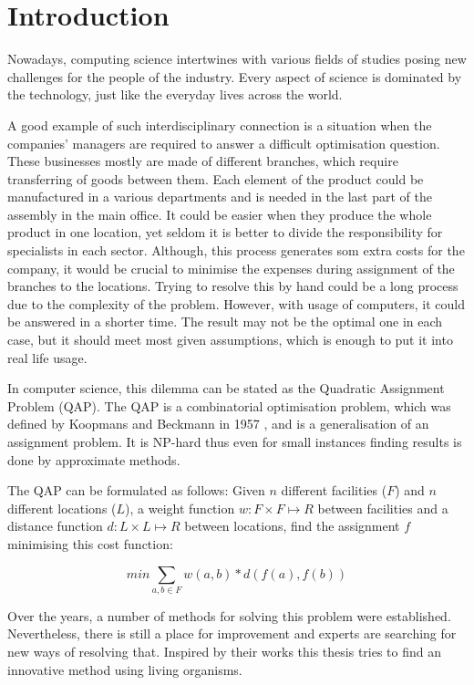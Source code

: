 \chapter{Introduction}
\label{chapter:introduction}

Nowadays, computing science intertwines with various fields of studies posing new challenges for the people of the industry. Every aspect of science is dominated by the technology, just like the everyday lives across the world.

A good example of such interdisciplinary connection is a situation when the companies' managers are required to answer a difficult optimisation question. These businesses mostly are made of different branches, which require transferring of goods between them. Each element of the product could be manufactured in a various departments and is needed in the last part of the assembly in the main office. It could be easier when they produce the whole product in one location, yet seldom it is better to divide the responsibility for specialists in each sector. Although, this process generates som extra costs for the company, it would be crucial to minimise the expenses during assignment of the branches to the locations. Trying to resolve this by hand could be a long process due to the complexity of the problem. However, with usage of computers, it could be answered in a shorter time. The result may not be the optimal one in each case, but it should meet most given assumptions, which is enough to put it into real life usage.

In computer science, this dilemma can be stated as the Quadratic Assignment Problem (QAP).  The QAP is a combinatorial optimisation problem, which was defined by Koopmans and Beckmann in 1957 \cite{koopmans-beckmann1957}, and is a generalisation of an assignment problem. It is NP-hard thus even for small instances finding results is done by approximate methods.

The QAP can be formulated as follows: Given $ n $ different facilities ($F$) and $ n $ different locations ($L$), a weight function $ w: F \times F \mapsto R $ between facilities and a distance function $ d: L \times L \mapsto R $ between locations, find the assignment $f$ minimising this cost function:

\begin{equation}
min \sum_{a, b \in F} w(a, b) * d( f(a), f(b))
\end{equation}

Over the years, a number of methods for solving this problem were established. Nevertheless, there is still a place for improvement and experts are searching for new ways of resolving that. Inspired by their works this thesis tries to find an innovative method using living organisms.

